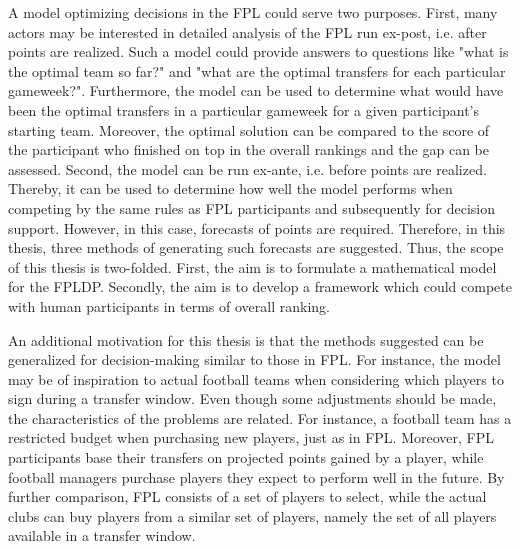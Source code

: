 \newpar

A model optimizing decisions in the FPL could serve two purposes. First, many actors may be interested in detailed analysis of the FPL run ex-post, i.e. after points are realized. Such a model could provide answers to questions like "what is the optimal team so far?" and "what are the optimal transfers for each particular gameweek?". Furthermore, the model can be used to determine what would have been the optimal transfers in a particular gameweek for a given participant's starting team. Moreover, the optimal solution can be compared to the score of the participant who finished on top in the overall rankings and the gap can be assessed. Second, the model can be run ex-ante, i.e. before points are realized. Thereby, it can be used to determine how well the model performs when competing by the same rules as FPL participants and subsequently for decision support. However, in this case, forecasts of points are required. Therefore, in this thesis, three methods of generating such forecasts are suggested. Thus, the scope of this thesis is two-folded. First, the aim is to formulate a mathematical model for the FPLDP. Secondly, the aim is to develop a framework which could compete with human participants in terms of overall ranking. 

\newpar

An additional motivation for this thesis is that the methods suggested can be generalized for decision-making similar to those in FPL. For instance, the model may be of inspiration to actual football teams when considering which players to sign during a transfer window. Even though some adjustments should be made, the characteristics of the problems are related. For instance, a football team has a restricted budget when purchasing new players, just as in FPL. Moreover, FPL participants base their transfers on projected points gained by a player, while football managers purchase players they expect to perform well in the future. By further comparison, FPL consists of a set of players to select, while the actual clubs can buy players from a similar set of players, namely the set of all players available in a transfer window.

\newpar


